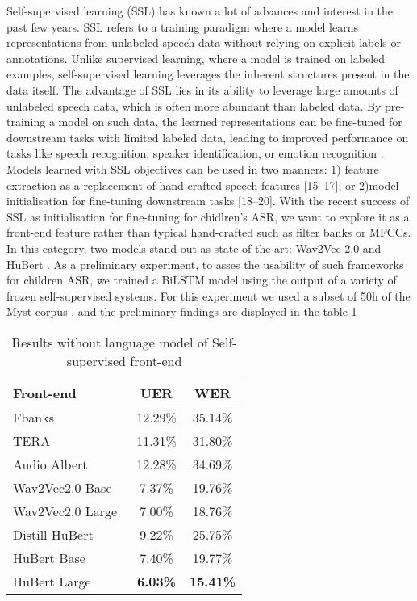 Self-supervised learning (SSL) has known a lot of advances and interest in the past few years. SSL refers to a training paradigm where a model learns representations from unlabeled speech data without relying on explicit labels or annotations. Unlike supervised learning, where a model is trained on labeled examples, self-supervised learning leverages the inherent structures present in the data itself. The advantage of SSL lies in its ability to leverage large amounts of unlabeled speech data, which is often more abundant than labeled data. By pre-training a model on such data, the learned representations can be fine-tuned for downstream tasks with limited labeled data, leading to improved performance on tasks like speech recognition, speaker identification, or emotion recognition \cite{baevski2020wav2vec}.
Models learned with SSL objectives can be used in two manners: 1) feature extraction as a replacement of hand-crafted speech features [15–17]; or 2)model initialisation for fine-tuning downstream tasks [18–20].
With the recent success of SSL as initialisation for fine-tuning for chidlren's ASR, we want to explore it as a front-end feature rather than typical hand-crafted such as filter banks or MFCCs. 
In this category, two models stand out as state-of-the-art: Wav2Vec 2.0 \cite{baevski2020wav2vec} and HuBert \cite{hsu2021hubert}. As a preliminary experiment, to asses the usability of such frameworks for children ASR, we trained a BiLSTM model using the output of a variety of frozen self-supervised systems. For this experiment we used a subset of 50h of the Myst corpus \cite{MyST}, and the preliminary findings are displayed in the table \ref{tab:ssl}
\begin{table}[ht]
\centering
\begin{tabular}{lcc} 
\hline
Front-end & UER & WER \\ 
\hline
Fbanks & 12.29\% & 35.14\% \\ 
\hline
TERA \cite{tera} & 11.31\% & 31.80\% \\
Audio Albert \cite{chi2021audio} & 12.28\% & 34.69\% \\
Wav2Vec2.0 Base & 7.37\% & 19.76\% \\
Wav2Vec2.0 Large~ & 7.00\% & 18.76\% \\
Distill HuBert \cite{chang2022distilhubert} & 9.22\% & 25.75\% \\
HuBert Base & 7.40\% & 19.77\% \\
HuBert Large & \textbf{6.03\%} & \textbf{15.41\%} \\
\hline
\end{tabular}
\caption{Results without language model of Self-supervised front-end}
\label{tab:ssl}
\end{table}

